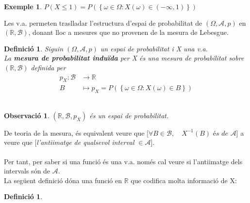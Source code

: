 \documentclass[12pt]{article}
\newcommand{\real}{\mathbb{R}}
\newcommand\inv[1]{#1^{-1}}
\newcommand\setb[1]{\left\{#1\right\}}
\theoremstyle{normal}
\newtheorem{obs}[lema]{Observació}
\theoremstyle{break}
\newtheorem{defi}[lema]{Definició}
\newtheorem{example}[lema]{Exemple}
\theoremstyle{breakthm}
\begin{document}
\begin{example}
  $P(X\leq 1) = P(\setb{\omega \in \Omega \colon X(\omega) \in (-\infty, 1)})$\\
\end{example}

Les v.a. permeten traslladar l'estructura d'espai de probabilitat de $(\Omega, \mathcal{A}, p)$ en $(\real, \mathcal{B})$, donant lloc a mesures que no provenen de la mesura de Lebesgue.\\

\newpage

\begin{defi}
  Siguin $(\Omega, \mathcal{A}, p)$ un espai de probabilitat i X una v.a. \\
  La \textbf{mesura de probabilitat induïda} per X és una mesura de probabilitat sobre $(\real, \mathcal{B})$ definida per
  \[
    \begin{aligned}
      p_{X} \colon \mathcal{B} &\to \real \\
      B &\mapsto p_{X} = P(\setb{\omega \in \Omega \colon X(\omega) \in B})
    \end{aligned}
  \]
  \\
\end{defi}

\begin{obs}
  $(\real, \mathcal{B},p_{X})$ és un espai de probabilitat.
\end{obs}

De teoria de la mesura, és equivalent veure que [$\forall B \in \mathcal{B}, \quad \inv{X}(B) \textit{ és de } \mathcal{A}$] a veure que [\textit{l'antiimatge de qualsevol interval} $\in \mathcal{A}$].\\\\
Per tant, per saber si una funció és una v.a. només cal veure si l'antiimatge dels intervals són de $\mathcal{A}$.\\

La següent definició dóna una funció en $\real$ que codifica molta informació de X:

\begin{defi}
  
\end{defi}
\end{document}
